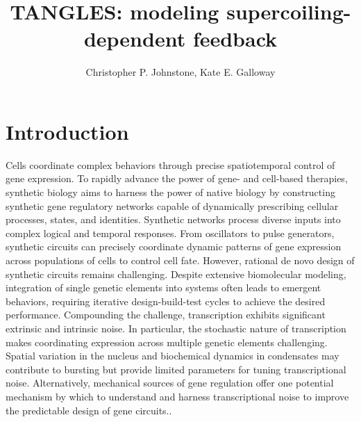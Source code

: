 \documentclass[11pt]{article}
\title{TANGLES: modeling supercoiling-dependent feedback}
\author{Christopher P. Johnstone, Kate E. Galloway}
\date{}
\begin{document}
\maketitle

\section{Introduction}
Cells coordinate complex behaviors through precise spatiotemporal control of gene expression. To rapidly advance the power of gene- and cell-based therapies, synthetic biology aims to harness the power of native biology by constructing synthetic gene regulatory networks capable of dynamically prescribing cellular processes, states, and identities.\parencite{chenSyntheticBiologyAdvancing2012,beitzSyntheticGeneCircuits2022,purnickSecondWaveSynthetic2009,elowitzBuildLifeUnderstand2010}
Synthetic networks process diverse inputs into complex logical and temporal responses.\parencite{weinbergLargescaleDesignRobust2017,xieMultiInputRNAiBasedLogic2011,taborSyntheticGeneticEdge2009}
From oscillators to pulse generators, synthetic circuits can  precisely coordinate dynamic patterns of gene expression across populations of cells to control cell fate.\parencite{gardnerConstructionGeneticToggle2000,elowitzSyntheticOscillatoryNetwork2000,strickerFastRobustTunable2008,daninoSynchronizedQuorumGenetic2010,maSyntheticMammalianSignaling2020a,parkEngineeringEpigeneticRegulation2019,bashorUsingEngineeredScaffold2008,gallowayDynamicallyReshapingSignaling2013}
However, rational de novo design of synthetic circuits remains challenging. Despite extensive biomolecular modeling, integration of single genetic elements into systems often leads to emergent behaviors, requiring iterative design-build-test cycles to achieve the desired performance.\parencite{jonesEndoribonucleasebasedFeedforwardController2020,freiCharacterizationMitigationGene2020,qianResourceCompetitionShapes2017}
Compounding the challenge, transcription exhibits significant extrinsic and intrinsic noise.\parencite{toNoiseCanInduce2010,zopfCellCycleDependenceTranscription2013,desaiDNArepairPathwayCan2021}
In particular, the stochastic nature of transcription makes coordinating expression across multiple genetic elements challenging.\parencite{rodriguezIntrinsicDynamicsHuman2019,rodriguezTranscriptionLivingCells2020,quartonUncouplingGeneExpression2020}
Spatial variation in the nucleus and biochemical dynamics in condensates may contribute to bursting but provide limited parameters for tuning transcriptional noise.\parencite{henningerRNAMediatedFeedbackControl2020,guoPolIIPhosphorylation2019}
Alternatively, mechanical sources of gene regulation offer one potential mechanism by which to understand and harness transcriptional noise to improve the predictable design of gene circuits.\parencite{johnstoneEngineeringCellularSymphonies2021,anconaTranscriptionalBurstsNonequilibrium2019a,kimLongDistanceCooperativeAntagonistic2019,elhoudaiguiBacterialGenomeArchitecture2019a,meyerTorsionMediatedInteractionAdjacent2014}.
\end{document}
